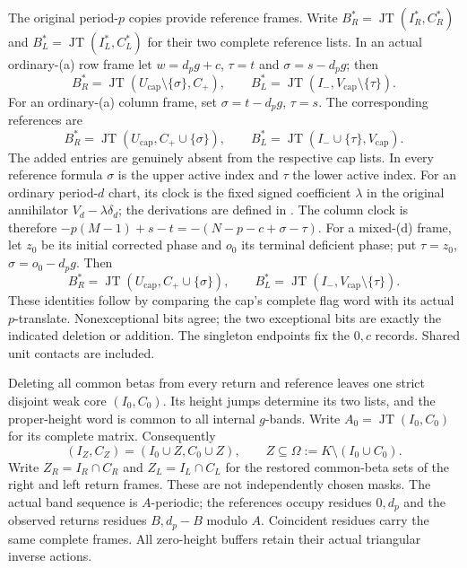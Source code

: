 \documentclass[11pt,a4paper]{amsart}
\numberwithin{equation}{section}
\theoremstyle{plain}
\theoremstyle{definition}
\newcommand{\JT}{\operatorname{JT}}
\begin{document}
The original period-\(p\) copies provide reference frames.
Write \(B_R^*=\JT(I_R^*,C_R^*)\) and \(B_L^*=\JT(I_L^*,C_L^*)\)
for their two complete reference lists.
In an actual ordinary-(a) row frame let \(w=d_pg+c\), \(\tau=t\)
and \(\sigma=s-d_pg\); then
\begin{equation}\label{eq:ordinary-references}
 B_R^*=\JT(U_{\mathrm{cap}}\setminus\{\sigma\},C_+),\qquad
 B_L^*=\JT(I_-,V_{\mathrm{cap}}\setminus\{\tau\}).
\end{equation}
For an ordinary-(a) column frame, set \(\sigma=t-d_pg\), \(\tau=s\).
The corresponding references are
\[
 B_R^*=\JT(U_{\mathrm{cap}},C_+\cup\{\sigma\}),\qquad
 B_L^*=\JT(I_-\cup\{\tau\},V_{\mathrm{cap}}).
\]
The added entries are genuinely absent from the respective cap lists.
In every reference formula \(\sigma\) is the upper active index and
\(\tau\) the lower active index.
For an ordinary period-\(d\) chart, its clock is the fixed signed
coefficient \(\lambda\) in the original annihilator
\(V_d-\lambda\delta_d\); the derivations are defined in
.  The column clock is therefore
\(-p(M-1)+s-t=-(N-p-c+\sigma-\tau)\).
For a mixed-(d) frame, let \(z_0\) be its initial corrected phase and \(o_0\)
its terminal deficient phase; put \(\tau=z_0\), \(\sigma=o_0-d_pg\).
Then
\[
 B_R^*=\JT(U_{\mathrm{cap}},C_+\cup\{\sigma\}),\qquad
 B_L^*=\JT(I_-,V_{\mathrm{cap}}\setminus\{\tau\}).
\]
These identities follow by comparing the cap's complete flag word with its
actual \(p\)-translate.  Nonexceptional bits agree; the two exceptional bits
are exactly the indicated deletion or addition.  The singleton endpoints
fix the \(0,c\) records.  Shared unit contacts are included.

Deleting all common betas from every return and reference leaves one
strict disjoint weak core \((I_0,C_0)\).  Its height jumps determine its two
lists, and the proper-height word is common to all internal \(g\)-bands.
Write \(A_0=\JT(I_0,C_0)\) for its complete matrix.
Consequently
\begin{equation}\label{eq:vacancy-template}
 (I_Z,C_Z)=(I_0\cup Z,C_0\cup Z),\qquad
 Z\subseteq\Omega:=K\setminus(I_0\cup C_0).
\end{equation}
Write \(Z_R=I_R\cap C_R\) and \(Z_L=I_L\cap C_L\) for the restored
common-beta sets of the right and left return frames.
These are not independently chosen masks.  The actual band sequence is
\(A\)-periodic; the references occupy residues \(0,d_p\) and the observed
returns residues \(B,d_p-B\) modulo \(A\).  Coincident residues carry the same
complete frames.  All zero-height buffers retain their actual triangular
inverse actions.
\end{document}
